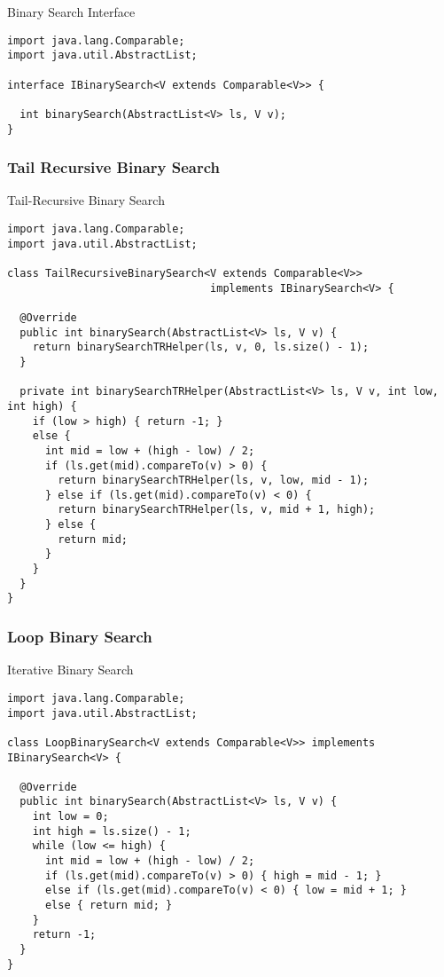 \begin{cl}[]{Binary Search Interface}
\begin{lstlisting}[language=MyJava]
import java.lang.Comparable;
import java.util.AbstractList;

interface IBinarySearch<V extends Comparable<V>> {
  
  int binarySearch(AbstractList<V> ls, V v);
}
\end{lstlisting}
\end{cl}

\subsubsection*{Tail Recursive Binary Search}

\begin{cl}[]{Tail-Recursive Binary Search}
\begin{lstlisting}[language=MyJava]
import java.lang.Comparable;
import java.util.AbstractList;

class TailRecursiveBinarySearch<V extends Comparable<V>> 
                                implements IBinarySearch<V> {

  @Override
  public int binarySearch(AbstractList<V> ls, V v) {
    return binarySearchTRHelper(ls, v, 0, ls.size() - 1);
  }

  private int binarySearchTRHelper(AbstractList<V> ls, V v, int low, int high) {
    if (low > high) { return -1; }
    else {
      int mid = low + (high - low) / 2;
      if (ls.get(mid).compareTo(v) > 0) { 
        return binarySearchTRHelper(ls, v, low, mid - 1); 
      } else if (ls.get(mid).compareTo(v) < 0) { 
        return binarySearchTRHelper(ls, v, mid + 1, high); 
      } else { 
        return mid; 
      }
    }
  }
}
\end{lstlisting}
\end{cl}

\subsubsection*{Loop Binary Search}

\begin{cl}[]{Iterative Binary Search}
\begin{lstlisting}[language=MyJava]
import java.lang.Comparable;
import java.util.AbstractList;
  
class LoopBinarySearch<V extends Comparable<V>> implements IBinarySearch<V> {
  
  @Override
  public int binarySearch(AbstractList<V> ls, V v) {
    int low = 0;
    int high = ls.size() - 1;
    while (low <= high) {
      int mid = low + (high - low) / 2;
      if (ls.get(mid).compareTo(v) > 0) { high = mid - 1; } 
      else if (ls.get(mid).compareTo(v) < 0) { low = mid + 1; } 
      else { return mid; }
    }
    return -1;
  }
}
\end{lstlisting}
\end{cl}

